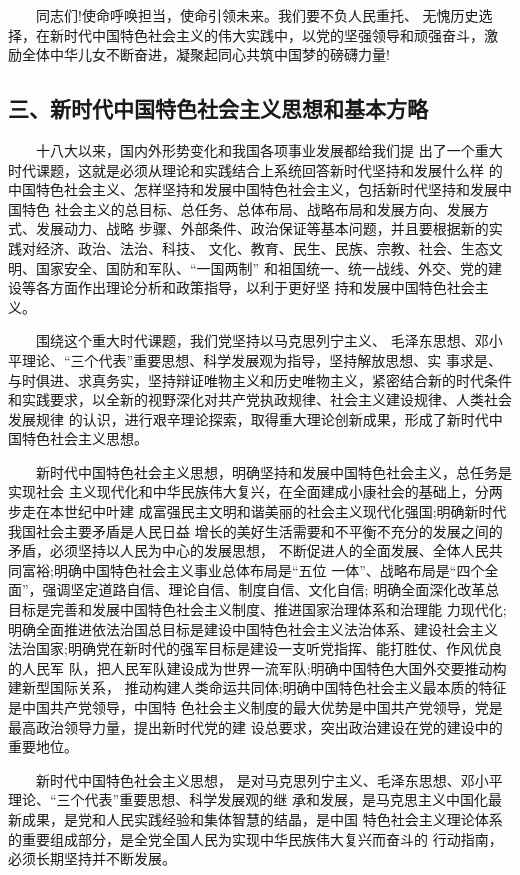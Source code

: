 \documentclass[11pt]{ctexart}
\begin{document}
{{{{　　同志们!使命呼唤担当，使命引领未来。我们要不负人民重托、
无愧历史选择，在新时代中国特色社会主义的伟大实践中，以党的坚强领导和顽强奋斗，激
励全体中华儿女不断奋进，凝聚起同心共筑中国梦的磅礴力量!

\subsection{三、新时代中国特色社会主义思想和基本方略}
\label{sec:org3dbae6c}

　　十八大以来，国内外形势变化和我国各项事业发展都给我们提
出了一个重大时代课题，这就是必须从理论和实践结合上系统回答新时代坚持和发展什么样
的中国特色社会主义、怎样坚持和发展中国特色社会主义，包括新时代坚持和发展中国特色
社会主义的总目标、总任务、总体布局、战略布局和发展方向、发展方式、发展动力、战略
步骤、外部条件、政治保证等基本问题，并且要根据新的实践对经济、政治、法治、科技、
文化、教育、民生、民族、宗教、社会、生态文明、国家安全、国防和军队、“一国两制”
和祖国统一、统一战线、外交、党的建设等各方面作出理论分析和政策指导，以利于更好坚
持和发展中国特色社会主义。

　　围绕这个重大时代课题，我们党坚持以马克思列宁主义、
毛泽东思想、邓小平理论、“三个代表”重要思想、科学发展观为指导，坚持解放思想、实
事求是、与时俱进、求真务实，坚持辩证唯物主义和历史唯物主义，紧密结合新的时代条件
和实践要求，以全新的视野深化对共产党执政规律、社会主义建设规律、人类社会发展规律
的认识，进行艰辛理论探索，取得重大理论创新成果，形成了新时代中国特色社会主义思想。

　　新时代中国特色社会主义思想，明确坚持和发展中国特色社会主义，总任务是实现社会
主义现代化和中华民族伟大复兴，在全面建成小康社会的基础上，分两步走在本世纪中叶建
成富强民主文明和谐美丽的社会主义现代化强国;明确新时代我国社会主要矛盾是人民日益
增长的美好生活需要和不平衡不充分的发展之间的矛盾，必须坚持以人民为中心的发展思想，
不断促进人的全面发展、全体人民共同富裕;明确中国特色社会主义事业总体布局是“五位
一体”、战略布局是“四个全面”，强调坚定道路自信、理论自信、制度自信、文化自信;
明确全面深化改革总目标是完善和发展中国特色社会主义制度、推进国家治理体系和治理能
力现代化;明确全面推进依法治国总目标是建设中国特色社会主义法治体系、建设社会主义
法治国家;明确党在新时代的强军目标是建设一支听党指挥、能打胜仗、作风优良的人民军
队，把人民军队建设成为世界一流军队;明确中国特色大国外交要推动构建新型国际关系，
推动构建人类命运共同体;明确中国特色社会主义最本质的特征是中国共产党领导，中国特
色社会主义制度的最大优势是中国共产党领导，党是最高政治领导力量，提出新时代党的建
设总要求，突出政治建设在党的建设中的重要地位。

　　新时代中国特色社会主义思想，
是对马克思列宁主义、毛泽东思想、邓小平理论、“三个代表”重要思想、科学发展观的继
承和发展，是马克思主义中国化最新成果，是党和人民实践经验和集体智慧的结晶，是中国
特色社会主义理论体系的重要组成部分，是全党全国人民为实现中华民族伟大复兴而奋斗的
行动指南，必须长期坚持并不断发展。

}}}}
\end{document}
